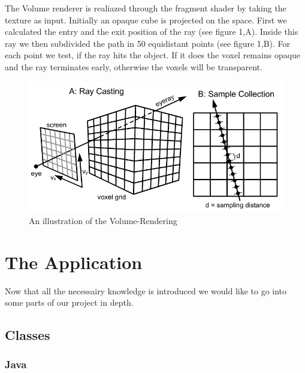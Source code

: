 \documentclass[10pt,twocolumn,letterpaper]{article}
\begin{document}
The Volume renderer is realiazed through the fragment shader by taking the texture as input. Initially an opaque cube is projected on the space. First we calculated the entry and the exit position of the ray (see figure 1,A). Inside this ray we then subdivided the path in 50 equidistant points (see figure 1,B). For each point we test, if the ray hits the object. If it does the voxel remains opaque and the ray terminates early, otherwise the voxels will be transparent. 
\begin{figure}[h]
	\begin{center}
		\includegraphics[width=0.8\linewidth]{./raycast.jpg}
		\caption{An illustration of the Volume-Rendering}
		\label{fig:texture}
	\end{center}
\end{figure}

\section{The Application}

Now that all the necessairy knowledge is introduced we would like to go into some parts of our project in depth.

\subsection{Classes}
\subsubsection{Java}
\end{document}
